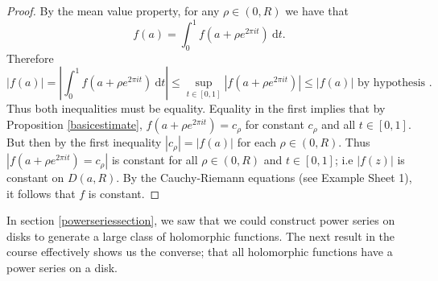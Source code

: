 \documentclass[egregdoesnotlikesansseriftitles,a4paper]{scrartcl}
\begin{document}
\begin{proof}
      By the mean value property, for any $\rho \in \left(0,R\right)$ we have that \[
      f \left(a\right)= \int_{0}^{1} f \left(a+\rho e^{2 \pi  it }\right) \ \mathrm{d}t 
      .\] Therefore \[
      \left|f \left(a\right)\right|=\left|\int_{0}^{1} f \left(a+\rho e^{2 \pi  it }\right) \ \mathrm{d}t \right| \leq \sup_{t\in [0,1]}\left|f \left(a+\rho e^{2 \pi it }\right)\right|\leq \left|f \left(a\right)\right| \text{ by hypothesis }
     .\] Thus both inequalities must be equality. Equality in the first implies that by Proposition \ref{basicestimate}, $f \left(a+\rho e^{2\pi i t}\right)=c_{\rho }$ for constant $c_{\rho }$ and all $t \in [0,1]$. But then by the first inequality $\left|c_{\rho }\right|=\left|f \left(a\right)\right|$ for each $\rho \in \left(0,R\right)$. Thus $\left|f \left(a+\rho e^{2\pi i t}\right)=c_{\rho }\right|$ is constant for all $\rho \in \left(0,R\right)$ and $t \in [0,1]$; i.e $\left|f \left(z\right)\right|$ is constant on $D \left(a,R\right)$. By the Cauchy-Riemann equations (see Example Sheet 1), it follows that $f$ is constant.
\end{proof}
In section \ref{powerseriessection}, we saw that we could construct power series on disks to generate a large class of holomorphic functions. The next result in the course effectively shows us the converse; that all holomorphic functions have a power series on a disk. 
\end{document}
